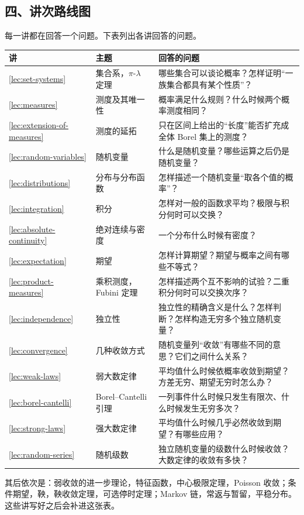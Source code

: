 \subsection*{四、讲次路线图}

每一讲都在回答一个问题。下表列出各讲回答的问题。

\begin{center}
\small
\begin{tabular}{p{1.2em}p{12.3em}p{20.5em}}
\toprule
讲 & 主题 & 回答的问题\\
\midrule
\ref{lec:set-systems} & 集合系，$\pi$-$\lambda$ 定理 & 哪些集合可以谈论概率？怎样证明“一族集合都具有某个性质”？\\
\ref{lec:measures} & 测度及其唯一性 & 概率满足什么规则？什么时候两个概率测度相同？\\
\ref{lec:extension-of-measures} & 测度的延拓 & 只在区间上给出的“长度”能否扩充成全体 Borel 集上的测度？\\
\ref{lec:random-variables} & 随机变量 & 什么是随机变量？哪些运算之后仍是随机变量？\\
\ref{lec:distributions} & 分布与分布函数 & 怎样描述一个随机变量“取各个值的概率”？\\
\ref{lec:integration} & 积分 & 怎样对一般的函数求平均？极限与积分何时可以交换？\\
\ref{lec:absolute-continuity} & 绝对连续与密度 & 一个分布什么时候有密度？\\
\ref{lec:expectation} & 期望 & 怎样计算期望？期望与概率之间有哪些不等式？\\
\ref{lec:product-measures} & 乘积测度，Fubini 定理 & 怎样描述两个互不影响的试验？二重积分何时可以交换次序？\\
\ref{lec:independence} & 独立性 & 独立性的精确含义是什么？怎样判断？怎样构造无穷多个独立随机变量？\\
\ref{lec:convergence} & 几种收敛方式 & 随机变量列“收敛”有哪些不同的意思？它们之间什么关系？\\
\ref{lec:weak-laws} & 弱大数定律 & 平均值什么时候依概率收敛到期望？方差无穷、期望无穷时怎么办？\\
\ref{lec:borel-cantelli} & Borel--Cantelli 引理 & 一列事件什么时候只发生有限次、什么时候发生无穷多次？\\
\ref{lec:strong-laws} & 强大数定律 & 平均值什么时候几乎必然收敛到期望？有哪些应用？\\
\ref{lec:random-series} & 随机级数 & 独立随机变量的级数什么时候收敛？大数定律的收敛有多快？\\
\bottomrule
\end{tabular}
\end{center}
其后依次是：弱收敛的进一步理论，特征函数，中心极限定理，Poisson 收敛；条件期望，鞅，鞅收敛定理，可选停时定理；Markov 链，常返与暂留，平稳分布。这些讲写好之后会补进这张表。

